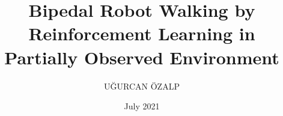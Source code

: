\documentclass[chaparabic,sc,ms,12pt,oneandhalf]{metu_iam}
\author{UĞURCAN ÖZALP}
\title{Bipedal Robot Walking by Reinforcement Learning in Partially Observed Environment}
\date{July 2021} %
\theoremstyle{definition}
\begin{document}
\begin{preliminaries}
\end{preliminaries}
%   
% 


























%
%
\appendix
%
%
%
%
%
\end{document}
